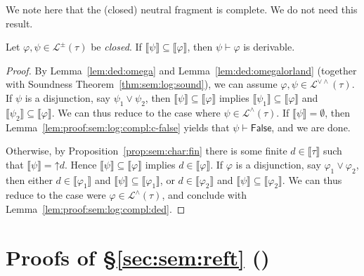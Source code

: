 \documentclass[%
  a4paper,
  UKenglish,
  cleveref,
  autoref,
  thm-restate,
  numberwithinsect,
]{lipics-v2021}
\newcommand\sle\subseteq
\newcommand\thesis{\vdash}
\newcommand\up{\mathord{\uparrow}}
\newcommand\I[1]{\llbracket #1 \rrbracket} %
\newcommand\temp[1]{\mathsf{#1}}
\newcommand\False{\temp{False}}
\newcommand\PT{\tau}		%
\newcommand\Lang{\mathcal{L}}
\begin{document}
We note here that the (closed) neutral fragment is complete.
We do not need this result.


\begin{corollary}
Let $\varphi, \psi \in \Lang^\pm(\PT)$ be \emph{closed}.
If $\I\psi \sle \I\varphi$,
then $\psi \thesis \varphi$ is derivable.
\end{corollary}

\begin{proof}
By Lemma~\ref{lem:ded:omega}
and Lemma~\ref{lem:ded:omegalorland}
(together with Soundness Theorem~\ref{thm:sem:log:sound}),
we can assume $\varphi,\psi \in \Lang^{\lor\land}(\PT)$.
%
If $\psi$ is a disjunction, say $\psi_1 \lor \psi_2$,
then $\I\psi \sle \I\varphi$
implies
$\I{\psi_1} \sle \I\varphi$
and
$\I{\psi_2} \sle \I\varphi$.
%
We can thus reduce to the case where $\psi \in \Lang^\land(\PT)$.
If $\I\psi = \emptyset$,
then Lemma~\ref{lem:proof:sem:log:compl:c-false}
yields that $\psi \thesis \False$,
and we are done.

Otherwise, by Proposition~\ref{prop:sem:char:fin}
there is some finite $d \in \I\PT$
such that $\I\psi = \up d$.
Hence $\I\psi \sle \I\varphi$
implies $d \in \I\varphi$.
If $\varphi$ is a disjunction, say $\varphi_1 \lor \varphi_2$,
then either $d \in \I{\varphi_1}$ and $\I\psi \sle \I{\varphi_1}$,
or $d \in \I{\varphi_2}$ and $\I\psi \sle \I{\varphi_2}$.
We can thus reduce to the case were $\varphi \in \Lang^\land(\PT)$,
and conclude with Lemma~\ref{lem:proof:sem:log:compl:ded}.
\end{proof}




\section{Proofs of \S\ref{sec:sem:reft} ()}
\label{sec:proof:sem:reft}
\end{document}
